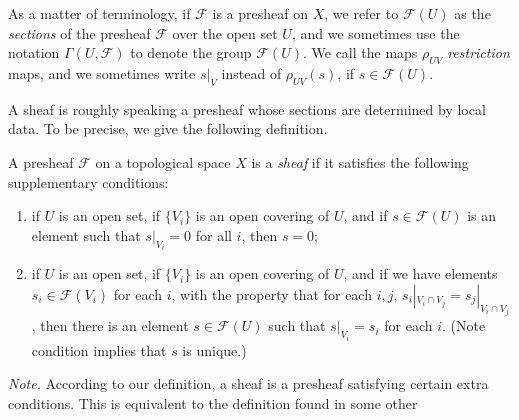 {As a matter of terminology, if $\mathcal F$ is a presheaf on $X$, we refer to $\mathcal F(U)$ as the \emph{sections} of the presheaf $\mathcal F$ over the open set $U$, and we sometimes use the notation $\Gamma(U,\mathcal F)$ to denote the group $\mathcal F(U)$. We call the maps $\rho_{UV}$ \emph{restriction} maps, and we sometimes write $s|_V$ instead of $\rho_{UV}(s)$, if $s\in\mathcal F(U)$.

\smallskip
A sheaf is roughly speaking a presheaf whose sections are determined by local data. To be precise, we give the following definition.

\Dfn A presheaf $\mathcal F$ on a topological space $X$ is a \emph{sheaf} if it satisfies the following supplementary conditions:
\begin{enumerate}[label=(\arabic*),leftmargin=2.4em,nosep]
\item[\hypertarget{def-II-1-condition-3}{}(3)] if $U$ is an open set, if $\{V_i\}$ is an open covering of $U$, and if $s\in\mathcal F(U)$ is an element such that $s|_{V_i}=0$ for all $i$, then $s=0$;
\item[\hypertarget{def-II-1-condition-4}{}(4)] if $U$ is an open set, if $\{V_i\}$ is an open covering of $U$, and if we have elements $s_i\in\mathcal F(V_i)$ for each $i$, with the property that for each $i,j$, $s_i|_{V_i\cap V_j}=s_j|_{V_i\cap V_j}$, then there is an element $s\in\mathcal F(U)$ such that $s|_{V_i}=s_i$ for each $i$. (Note condition  implies that $s$ is unique.)
\end{enumerate}

\medskip
\emph{Note.} According to our definition, a sheaf is a presheaf satisfying certain extra conditions. This is equivalent to the definition found in some other
}
